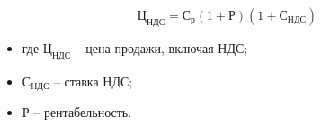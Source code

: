 \documentclass[14pt]{extarticle}
\begin{document}
\noindent
\begin{minipage}{1\linewidth}
\begin{equation}
  \text{Ц}_\text{НДС} = \text{С}_\text{р}(1+\text{Р})(1+\text{С}_\text{НДС})
\end{equation}
\begin{itemize}[nosep, leftmargin=0pt, labelindent=0pt, itemsep=0pt, parsep=0pt]
  \item[] где $\text{Ц}_\text{НДС}$ -- цена продажи, включая НДС;
  \item[] \hspace*{12.5mm}$\text{С}_\text{НДС}$ -- ставка НДС;
  \item[] \hspace*{12.5mm}Р -- рентабельность.
\end{itemize}
\end{minipage}







\end{document}
